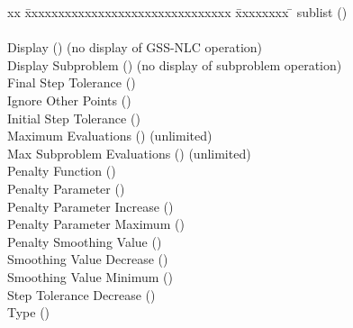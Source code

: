 \begin{tabbing}
  xx \= xxxxxxxxxxxxxxxxxxxxxxxxxxxxxxx \= xxxxxxxx \= \kill
   sublist ()  \\
                 
        \\

  \>Display                            ()
       (no display of GSS-NLC operation)  \\
  \>Display Subproblem                 ()
       (no display of subproblem operation)  \\
  \>Final Step Tolerance               ()
        \\
  \>Ignore Other Points                ()
        \\
  \>Initial Step Tolerance             ()
        \\
  \>Maximum Evaluations                ()
       (unlimited)  \\
  \>Max Subproblem Evaluations         ()
       (unlimited)  \\
  \>Penalty Function                   ()
        \\
  \>Penalty Parameter                  ()
        \\
  \>Penalty Parameter Increase         ()
        \\
  \>Penalty Parameter Maximum          ()
        \\
  \>Penalty Smoothing Value            ()
        \\
  \>Smoothing Value Decrease           ()
        \\
  \>Smoothing Value Minimum            ()
        \\
  \>Step Tolerance Decrease            ()
        \\
  \>Type                               ()
\end{tabbing}


